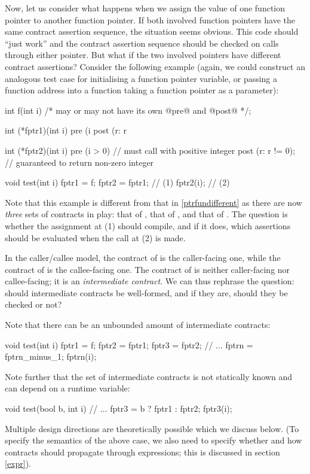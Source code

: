 Now, let us consider what happens when we assign the value of one function pointer to another function pointer. If both involved function pointers have the same contract assertion sequence, the situation seems obvious. This code should ``just work'' and the contract assertion sequence should be checked on calls through either pointer. But what if the two involved pointers have different contract assertions? Consider the following example (again, we could construct an analogous test case for initialising a function pointer variable, or passing a function address into a function taking a function pointer as a parameter):
\begin{codeblock}
int f(int i) /* may or may not have its own @pre@ and @post@ */;

int (*fptr1)(int i)
  pre (i %
  post (r: r %

int (*fptr2)(int i)
  pre (i > 0)           // must call with positive integer
  post (r: r != 0);     // guaranteed to return non-zero integer

void test(int i) {
  fptr1 = f;
  fptr2 = fptr1;  // (1)
  fptr2(i);       // (2)
}
\end{codeblock}
Note that this example is different from that in \ref{ptrfundifferent} as there are now \emph{three} sets of contracts in play: that of , that of , and that of . The question is whether the assignment at (1) should compile, and if it does, which assertions should be evaluated when the call at (2) is made. 

In the caller/callee model, the contract of  is the caller-facing one, while the contract  of  is the callee-facing one. The contract of  is neither caller-facing nor callee-facing; it is an \emph{intermediate contract}. We can thus rephrase the question: should intermediate contracts be well-formed, and if they are, should they be checked or not?

Note that there can be an unbounded amount of intermediate contracts:
\begin{codeblock}
void test(int i) {
  fptr1 = f;
  fptr2 = fptr1; 
  fptr3 = fptr2;
  // ...
  fptrn = fptrn_minus_1;
  fptrn(i);
}
\end{codeblock}
Note further that the set of intermediate contracts is not statically known and can depend on a runtime variable:
\begin{codeblock}
void test(bool b, int i) {
  // ...
  fptr3 = b ? fptr1 : fptr2;
  fptr3(i);
}
\end{codeblock}
Multiple design directions are theoretically possible which we discuss below. (To specify the semantics of the above case, we also need to specify whether and how contracts should propagate through expressions; this is discussed in section \ref{expr}).

